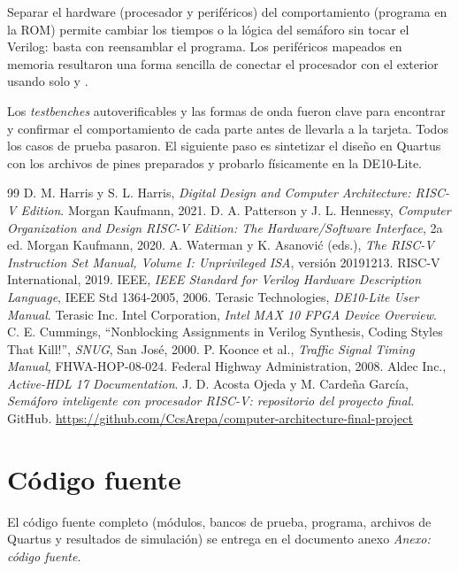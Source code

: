 \documentclass[12pt,letterpaper]{article}
\newif\ifcodigo
\begin{document}
Separar el hardware (procesador y periféricos) del comportamiento (programa en la ROM) permite
cambiar los tiempos o la lógica del semáforo sin tocar el Verilog: basta con reensamblar el
programa. Los periféricos mapeados en memoria resultaron una forma sencilla de conectar el
procesador con el exterior usando solo  y .

Los \emph{testbenches} autoverificables y las formas de onda fueron clave para encontrar y
confirmar el comportamiento de cada parte antes de llevarla a la tarjeta. Todos los casos de
prueba pasaron. El siguiente paso es sintetizar el diseño en Quartus con los archivos de pines
preparados y probarlo físicamente en la DE10-Lite.

\begin{thebibliography}{99}
 D. M. Harris y S. L. Harris, \emph{Digital Design and Computer Architecture:
  RISC-V Edition}. Morgan Kaufmann, 2021.
 D. A. Patterson y J. L. Hennessy, \emph{Computer Organization and Design
  RISC-V Edition: The Hardware/Software Interface}, 2a ed. Morgan Kaufmann, 2020.
 A. Waterman y K. Asanović (eds.), \emph{The RISC-V Instruction Set Manual,
  Volume I: Unprivileged ISA}, versión 20191213. RISC-V International, 2019.
 IEEE, \emph{IEEE Standard for Verilog Hardware Description Language},
  IEEE Std 1364-2005, 2006.
 Terasic Technologies, \emph{DE10-Lite User Manual}. Terasic Inc.
 Intel Corporation, \emph{Intel MAX 10 FPGA Device Overview}.
 C. E. Cummings, ``Nonblocking Assignments in Verilog Synthesis, Coding
  Styles That Kill!'', \emph{SNUG}, San José, 2000.
 P. Koonce et al., \emph{Traffic Signal Timing Manual}, FHWA-HOP-08-024.
  Federal Highway Administration, 2008.
 Aldec Inc., \emph{Active-HDL 17 Documentation}.
 J. D. Acosta Ojeda y M. Cardeña García, \emph{Semáforo inteligente con procesador
  RISC-V: repositorio del proyecto final}. GitHub.
  \url{https://github.com/CcsArepa/computer-architecture-final-project}
\end{thebibliography}

\appendix
\ifcodigo
  
\else
  \newpage
  \section{Código fuente}\label{ap:codigo}\label{ap:tbs}\label{ap:programas}\label{ap:quartus}\label{ap:logs}
  El código fuente completo (módulos, bancos de prueba, programa, archivos de
  Quartus y resultados de simulación) se entrega en el documento anexo
  \emph{Anexo: código fuente}.
\fi
\end{document}
